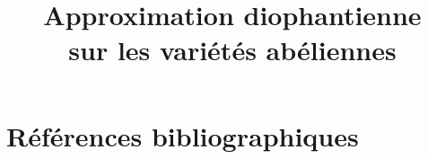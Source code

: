 \documentclass[nomencl]{mpg-preth}
\title{Approximation diophantienne \\ sur les variétés abéliennes}
\begin{document}
\maketitle
{}

\setupmagicinclude






\appendix




\chapter{Références bibliographiques}
\printbibliography[heading=bibempty]
\end{document}
